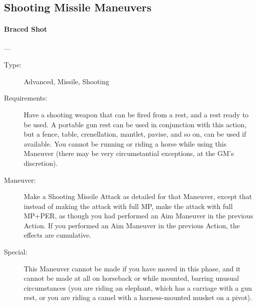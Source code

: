 \documentclass[oneside,11pt,english]{book}
\begin{document}
\subsection{Shooting Missile Maneuvers}
\paragraph{\large\label{man:Braced Shot}Braced Shot}---\quad{\large[???????]}
\vspace{-10pt}\begin{description} 
\item [Type:] Advanced, Missile, Shooting 
\item [Requirements:] Have a shooting weapon that can be fired from a rest, and a rest ready to be used. A 
portable gun rest can be used in conjunction with this action, but a fence, table, crenellation, mantlet, 
pavise, and so on, can be used if available. You cannot be running or riding a horse while using this 
Maneuver (there may be very circumstantial exceptions, at the GM’s discretion). 
\item [Maneuver:] Make a Shooting Missile Attack as detailed for that Maneuver, except that instead of making 
the attack with full MP, make the attack with full MP+PER, as though you had performed an Aim 
Maneuver in the previous Action. If you performed an Aim Maneuver in the previous Action, the effects 
are cumulative. 
\item [Special:] This Maneuver cannot be made if you have moved in this phase, and it cannot be made at all on 
horseback or while mounted, barring unusual circumstances (you are riding an elephant, which has a 
carriage with a gun rest, or you are riding a camel with a harness-mounted musket on a pivot). 
\end{description}
\end{document}
